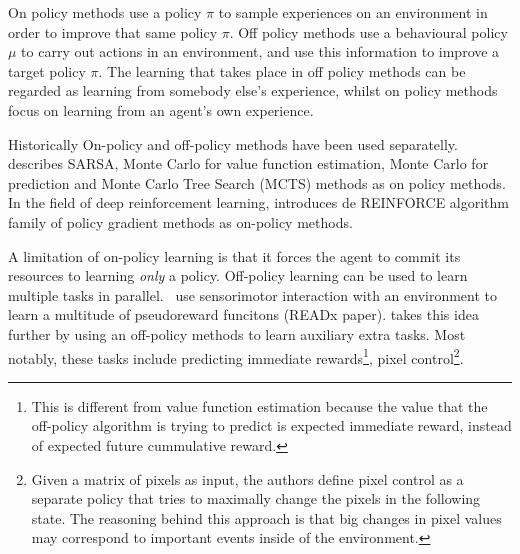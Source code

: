 \documentclass{../main.tex}{subfiles}
\begin{document}
On policy methods use a policy $\pi$ to sample experiences on an environment in order to improve that same policy $\pi$. Off policy methods use a behavioural policy $\mu$ to carry out actions in an environment, and use this information to improve a target policy $\pi$. The learning that takes place in off policy methods can be regarded as learning from somebody else's experience, whilst on policy methods focus on learning from an agent's own experience.

Historically On-policy and off-policy methods have been used separatelly. \cite{Sutton1998} describes SARSA, Monte Carlo for value function estimation, Monte Carlo for prediction and Monte Carlo Tree Search (MCTS) methods as on policy methods. In the field of deep reinforcement learning, \cite{Williams1992} introduces de REINFORCE algorithm family of policy gradient methods as on-policy methods. 

A limitation of on-policy learning is that it forces the agent to commit its resources to learning \textit{only} a policy. Off-policy learning can be used to learn multiple tasks in parallel.~\cite{Sutton2010} use sensorimotor interaction with an environment to learn a multitude of pseudoreward funcitons (READx paper). \cite{Jaderberg2016} takes this idea further by using an off-policy methods to learn auxiliary extra tasks. Most notably, these tasks include predicting immediate rewards\footnote{This is different from value function estimation because the value that the off-policy algorithm is trying to predict is expected immediate reward, instead of expected future cummulative reward.}, pixel control\footnote{Given a matrix of pixels as input, the authors define pixel control as a separate policy that tries to maximally change the pixels in the following state. The reasoning behind this approach is that big changes in pixel values may correspond to important events inside of the environment.}.
\end{document}
